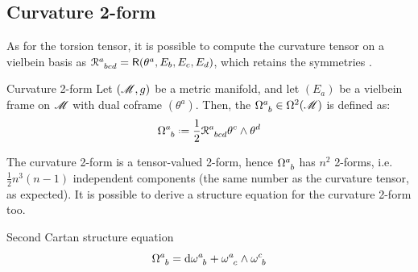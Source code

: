 \subsection{Curvature 2-form}

As for the torsion tensor, it is possible to compute the curvature tensor on a vielbein basis as $ \tensor{\rr}{^a_{bcd}} = \riem(\theta^a , E_b , E_c , E_d) $, which retains the symmetries .

\begin{definition}{Curvature 2-form}{}
  Let $ (\mathscr{M},g) $ be a metric manifold, and let $ (E_a) $ be a vielbein frame on $ \mathscr{M} $ with dual coframe $ (\theta^a) $. Then, the  $ \tensor{\Omega}{^a_b} \in \df{2} $ is defined as:
  \begin{equation}
    \tensor{\Omega}{^a_b} \defeq \frac{1}{2} \tensor{\rr}{^a_{bcd}} \theta^c \wedge \theta^d
    \label{eq:curvature-2-def}
  \end{equation}
\end{definition}

The curvature 2-form is a tensor-valued 2-form, hence $ \tensor{\Omega}{^a_b} $ has $ n^2 $ 2-forms, i.e. $ \frac{1}{2} n^3 (n-1) $ independent components (the same number as the curvature tensor, as expected). It is possible to derive a structure equation for the curvature 2-form too.

\begin{theorem}[before upper = {\tcbtitle}]{Second Cartan structure equation}{}
  \begin{equation}
    \tensor{\Omega}{^a_b} = \dd \tensor{\omega}{^a_b} + \tensor{\omega}{^a_c} \wedge \tensor{\omega}{^c_b}
    \label{eq:second-cartan-stru-eq}
  \end{equation}
\end{theorem}

